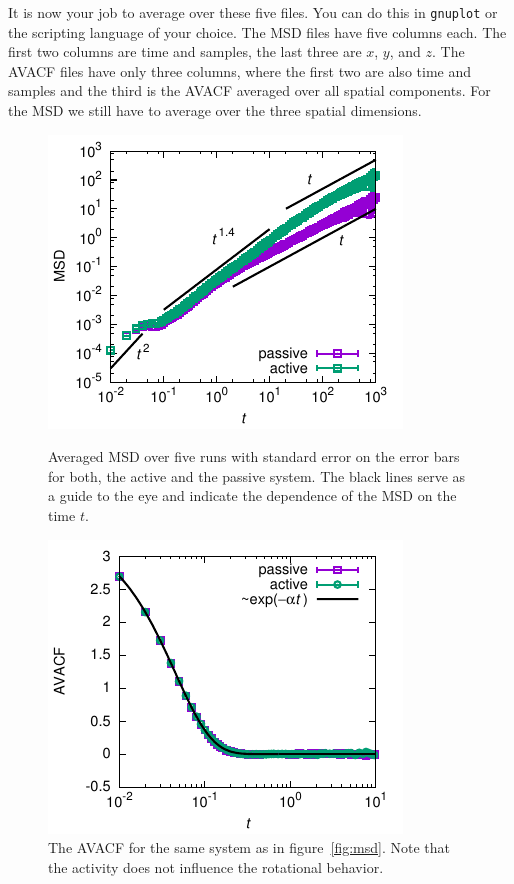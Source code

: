 \documentclass[aip,jcp,reprint,a4paper,onecolumn,nofootinbib,amsmath,amssymb]{revtex4-1}
\newcommand\code{\lstinline}
\begin{document}
It is now your job to average over these five files. You can do this in \code{gnuplot} or the scripting language of your choice. The MSD files have five columns each. The first two columns are time and samples, the last three are $x$, $y$, and $z$. The AVACF files have only three columns, where the first two are also time and samples and the third is the AVACF averaged over all spatial components. For the MSD we still have to average over the three spatial dimensions.

\begin{figure}[tb]
  \centering
  \leavevmode\hfill
  \begin{minipage}[t]{.45\linewidth}
    \centering
    \includegraphics{FIGURES/msd}
    \caption{Averaged MSD over five runs with standard error on the
      error bars for both, the active and the passive system. The
      black lines serve as a guide to the eye and indicate the
      dependence of the MSD on the time $t$.}
    \label{fig:msd}
  \end{minipage}
  \hfill
  \begin{minipage}[t]{.45\linewidth}
    \centering
    \includegraphics{FIGURES/avacf}
    \caption{The AVACF for the same system as in
      figure~\ref{fig:msd}. Note that the activity does not influence
      the rotational behavior.}
    \label{fig:avacf}
  \end{minipage}
  \hfill\null
\end{figure}
\end{document}
